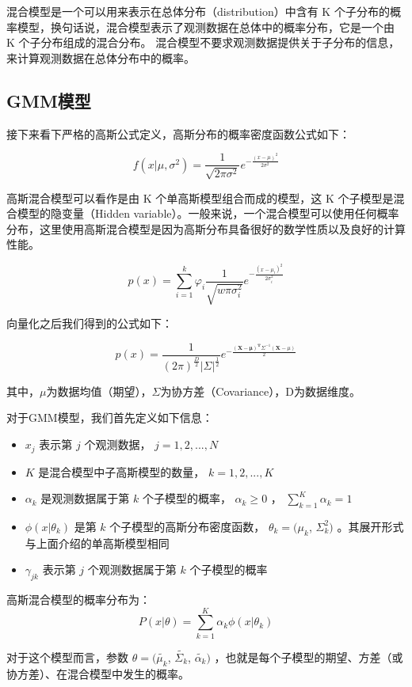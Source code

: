 \documentclass{ML}
\begin{document}
混合模型是一个可以用来表示在总体分布（distribution）中含有 K 个子分布的概率模型，换句话说，混合模型表示了观测数据在总体中的概率分布，它是一个由 K 个子分布组成的混合分布。
混合模型不要求观测数据提供关于子分布的信息，来计算观测数据在总体分布中的概率。

\subsection{GMM模型}
接下来看下严格的高斯公式定义，高斯分布的概率密度函数公式如下：

$$f(x|\mu,\sigma^2) = \frac{1}{\sqrt{2 \pi \sigma^2}}e^{-\frac{(x- \mu )^2}{2 \sigma^2}}$$

高斯混合模型可以看作是由 K 个单高斯模型组合而成的模型，这 K 个子模型是混合模型的隐变量（Hidden variable）。一般来说，一个混合模型可以使用任何概率分布，这里使用高斯混合模型是因为高斯分布具备很好的数学性质以及良好的计算性能。

$$p(x) = \sum^k_{i=1}\varphi_i\frac{1}{\sqrt{w \pi \sigma_i^2}}e^{-\frac{(x- \mu_i)^2}{2 \sigma_i^2}}$$

向量化之后我们得到的公式如下：

$$p(x) = \frac{1}{(2\pi)^{\frac{D}{2}}|\Sigma|^\frac{1}{2}}e^{-\frac{\mathbf{(X-\mu)^T}\Sigma^{-1}(\mathbf{X}-\mu)}{2}}$$

其中，$\mu$为数据均值（期望），$\Sigma$为协方差（Covariance），D为数据维度。

对于GMM模型，我们首先定义如下信息：

\begin{itemize}
	\item $x_{j}$ 表示第 $j$ 个观测数据， $j = 1,2,...,N$
	\item $K$ 是混合模型中子高斯模型的数量， $k = 1,2,...,K$
	\item $\alpha_{k}$ 是观测数据属于第 $k$ 个子模型的概率， $\alpha_{k} \geq 0$ ， $\sum_{k=1}^{K}{\alpha_{k}} = 1$
	\item $\phi(x|\theta_{k})$ 是第 $k$ 个子模型的高斯分布密度函数， $\theta_{k} = (\mu_{k}$, $\Sigma_{k}^{2})$ 。其展开形式与上面介绍的单高斯模型相同
	\item $\gamma_{jk}$ 表示第 $j$ 个观测数据属于第 $k$ 个子模型的概率
\end{itemize}

高斯混合模型的概率分布为：
$$P(x|\theta) = \sum_{k=1}^{K}{\alpha_{k}\phi(x|\theta_{k})}$$

对于这个模型而言，参数 $\theta = (\tilde{\mu_{k}}$, $\tilde{\Sigma_{k}}$, $\tilde{\alpha_{k}})$ ，也就是每个子模型的期望、方差（或协方差）、在混合模型中发生的概率。
\end{document}
